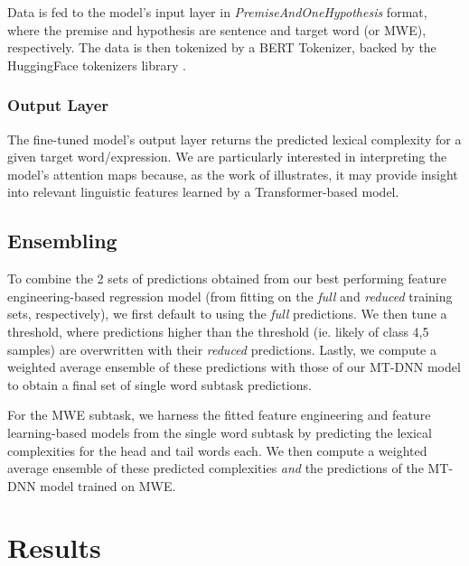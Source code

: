 \documentclass[11pt,a4paper]{article}
\begin{document}
Data is fed to the model's input layer in \textit{PremiseAndOneHypothesis} format, where the premise and hypothesis are sentence and target word (or MWE), respectively. The data is then tokenized by a BERT Tokenizer, backed by the HuggingFace tokenizers library \citep{wolf_etal_2020_transformers}.

\subsubsection{Output Layer}

The fine-tuned model's output layer returns the predicted lexical complexity for a given target word/expression. We are particularly interested in interpreting the model's attention maps because, as the work of \citep{DBLP:journals/corr/abs-1906-04341} illustrates, it may provide insight into relevant linguistic features learned by a Transformer-based model.

\subsection{Ensembling}

To combine the 2 sets of predictions obtained from our best performing feature engineering-based regression model (from fitting on the \textit{full} and \textit{reduced} training sets, respectively), we first default to using the \textit{full} predictions. We then tune a threshold, where predictions higher than the threshold (ie. likely of class 4,5 samples) are overwritten with their \textit{reduced} predictions. Lastly, we compute a weighted average ensemble of these predictions with those of our MT-DNN model to obtain a final set of single word subtask predictions. 

For the MWE subtask, we harness the fitted feature engineering and feature learning-based models from the single word subtask by predicting the lexical complexities for the head and tail words each. We then compute a weighted average ensemble of these predicted complexities \textit{and} the predictions of the MT-DNN model trained on MWE.

\section{Results}
\end{document}

